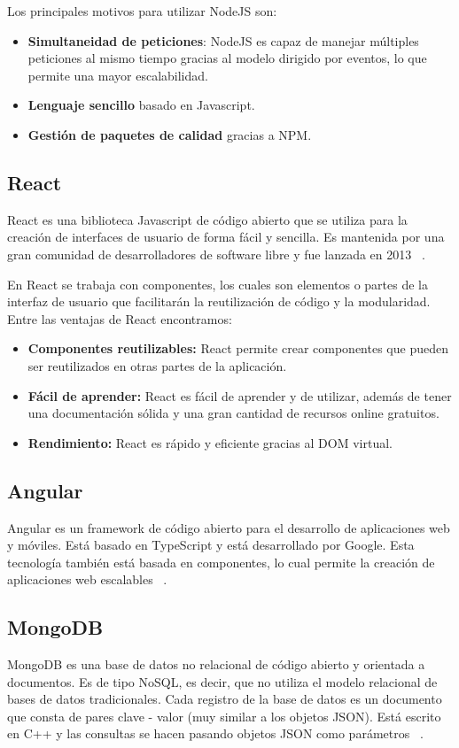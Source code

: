 Los principales motivos para utilizar NodeJS son:
\begin{itemize}
    \item \textbf{Simultaneidad de peticiones}: NodeJS es capaz de manejar múltiples peticiones al mismo tiempo gracias al modelo dirigido por eventos, 
    lo que permite una mayor escalabilidad.
    \item \textbf{Lenguaje sencillo} basado en Javascript.
    \item \textbf{Gestión de paquetes de calidad} gracias a NPM.
\end{itemize}


\subsection{React}
React es una biblioteca Javascript de código abierto que se utiliza para la creación de interfaces de usuario de forma fácil y sencilla.
Es mantenida por una gran comunidad de desarrolladores de software libre y fue lanzada en 2013 ~\cite{react}. 

En React se trabaja con componentes, los cuales son elementos o partes de la interfaz de usuario que facilitarán la reutilización de código y la modularidad.
\newpage
Entre las ventajas de React encontramos:
\begin{itemize}
\item \textbf{Componentes reutilizables:} React permite crear componentes que pueden ser reutilizados en otras partes de la aplicación.
\item \textbf{Fácil de aprender:} React es fácil de aprender y de utilizar, además de tener una documentación sólida y una gran cantidad de recursos online gratuitos.
\item \textbf{Rendimiento:} React es rápido y eficiente gracias al DOM virtual.
\end{itemize}

\subsection{Angular}
Angular es un framework de código abierto para el desarrollo de aplicaciones web y móviles. Está basado en TypeScript y está desarrollado por Google.
Esta tecnología también está basada en componentes, lo cual permite la creación de aplicaciones web escalables ~\cite{angular}.

\subsection{MongoDB}
MongoDB es una base de datos no relacional de código abierto y orientada a documentos. 
Es de tipo NoSQL, es decir, que no utiliza el modelo relacional de bases de datos tradicionales.
Cada registro de la base de datos es un documento que consta de pares clave - valor (muy similar a los objetos JSON).
Está escrito en C++ y las consultas se hacen pasando objetos JSON como parámetros ~\cite{mongodb}.

